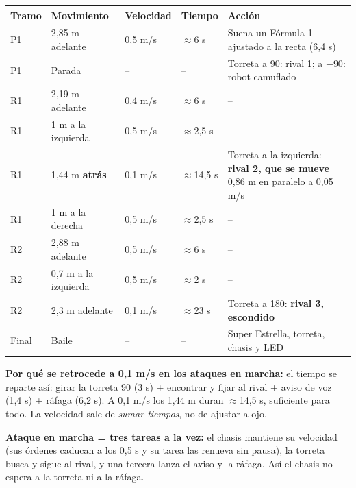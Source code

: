 \documentclass[11pt,a4paper]{article}
\newcommand{\gr}{\textdegree{}}
\begin{document}
\begin{center}
\small
\begin{tabular}{@{}P{1.3cm}P{3.4cm}P{1.9cm}P{1.7cm}P{5.6cm}@{}}
\toprule
\textbf{Tramo} & \textbf{Movimiento} & \textbf{Velocidad} & \textbf{Tiempo} & \textbf{Acción} \\
\midrule
P1 & 2,85 m adelante & 0,5 m/s & $\approx$6 s & Suena un Fórmula 1 ajustado a la recta (6,4 s) \\
P1 & Parada & -- & -- & Torreta a 90\gr: rival 1; a $-90$\gr: robot camuflado \\
R1 & 2,19 m adelante & 0,4 m/s & $\approx$6 s & -- \\
R1 & 1 m a la izquierda & 0,5 m/s & $\approx$2,5 s & -- \\
R1 & 1,44 m \textbf{atrás} & 0,1 m/s & $\approx$14,5 s & Torreta a la izquierda: \textbf{rival 2, que se mueve} 0,86 m en paralelo a 0,05 m/s \\
R1 & 1 m a la derecha & 0,5 m/s & $\approx$2,5 s & -- \\
R2 & 2,88 m adelante & 0,5 m/s & $\approx$6 s & -- \\
R2 & 0,7 m a la izquierda & 0,5 m/s & $\approx$2 s & -- \\
R2 & 2,3 m adelante & 0,1 m/s & $\approx$23 s & Torreta a 180\gr: \textbf{rival 3, escondido} \\
Final & Baile & -- & -- & Super Estrella, torreta, chasis y LED \\
\bottomrule
\end{tabular}
\end{center}

\textbf{Por qué se retrocede a 0,1 m/s en los ataques en marcha:} el tiempo se reparte así: girar la torreta 90\gr{} (3 s) + encontrar y fijar al rival + aviso de voz (1,4 s) + ráfaga (6,2 s). A 0,1 m/s los 1,44 m duran $\approx$14,5 s, suficiente para todo. La velocidad sale de \emph{sumar tiempos}, no de ajustar a ojo.

\textbf{Ataque en marcha = tres tareas a la vez:} el chasis mantiene su velocidad (sus órdenes caducan a los 0,5 s y su tarea las renueva sin pausa), la torreta busca y sigue al rival, y una tercera lanza el aviso y la ráfaga. Así el chasis no espera a la torreta ni a la ráfaga.
\end{document}
